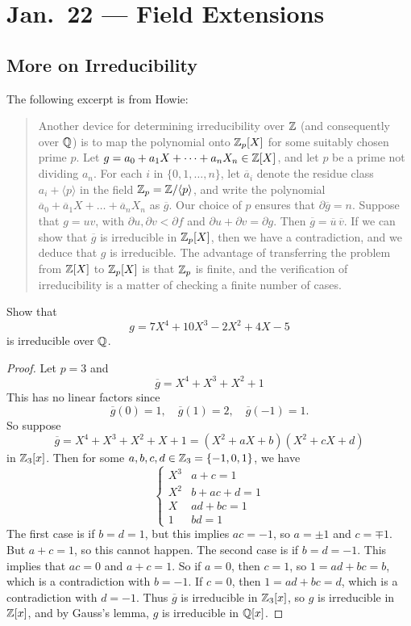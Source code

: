 \chapter{Jan.~22 --- Field Extensions}
\section{More on Irreducibility}
The following excerpt is from Howie:
\begin{quote}
  Another device for determining irreducibility over $\mathbb{Z}$ (and consequently over $\mathbb{Q}$) is to map the polynomial onto $\mathbb{Z}_p[X]$ for some suitably chosen prime $p$. Let $g = a_0 +a_1X + \dots +a_nX_n \in \mathbb{Z}[X]$, and let $p$ be a prime not dividing $a_n$. For each $i$ in $\{0, 1, \dots, n\}$, let $\overline{a}_i$ denote the residue class $a_i + \langle p \rangle$ in the field $\mathbb{Z}_p = \mathbb{Z} / \langle p \rangle$, and write the polynomial $\overline{a}_0 + \overline{a}_1X + \dots + \overline{a}_n X_n$ as $\overline{g}$. Our choice of $p$ ensures that $\partial \overline{g} = n$. Suppose that $g = uv$, with $\partial u, \partial v < \partial f$ and $\partial u + \partial v = \partial g$. Then $\overline{g} = \overline{u}\,\overline{v}$. If we can show that $\overline{g}$ is irreducible in $\mathbb{Z}_p[X]$, then we have a contradiction, and we deduce that $g$ is irreducible. The advantage of transferring the problem from $\mathbb{Z}[X]$ to $\mathbb{Z}_p[X]$ is that $\mathbb{Z}_p$ is finite, and the verification of irreducibility is a matter of checking a finite number of cases.
\end{quote}

\begin{example}
  Show that
  \[g = 7X^4 + 10X^3 - 2X^2 + 4X - 5\]
  is irreducible over $\mathbb{Q}$.
\end{example}

\begin{proof}
  Let $p = 3$ and
  \[\overline{g} = X^4 + X^3 + X^2 + 1\]
  This has no linear factors since
  \[\overline{g}(0) = 1, \quad \overline{g}(1) = 2, \quad \overline{g}(-1) = 1.\]
  So suppose
  \[
    \overline{g} = X^4 + X^3 + X^2 + X + 1
    = (X^2 + aX + b)(X^2 + cX + d)
  \]
  in $\mathbb{Z}_3[x]$. Then for some
  $a, b, c, d \in \mathbb{Z}_3 = \{-1, 0, 1\}$, we have
  \[
    \begin{cases}
      X^3 & a + c = 1 \\
      X^2 & b + ac + d = 1 \\
      X & ad + bc = 1 \\
      1 & bd = 1
    \end{cases}
  \]
  The first case is if $b = d = 1$, but this
  implies $ac = -1$, so $a = \pm 1$ and $c = \mp 1$.
  But $a + c = 1$, so this cannot happen. The
  second case is if $b = d = -1$. This implies
  that $ac = 0$ and $a + c = 1$. So if $a = 0$,
  then $c = 1$, so $1 = ad + bc = b$, which is
  a contradiction with $b = -1$. If $c = 0$,
  then $1 = ad + bc = d$, which is a contradiction
  with $d = -1$. Thus $\overline{g}$ is irreducible
  in $\mathbb{Z}_3[x]$, so $g$ is irreducible in $\mathbb{Z}[x]$,
  and by Gauss's lemma, $g$ is irreducible in $\mathbb{Q}[x]$.
\end{proof}

